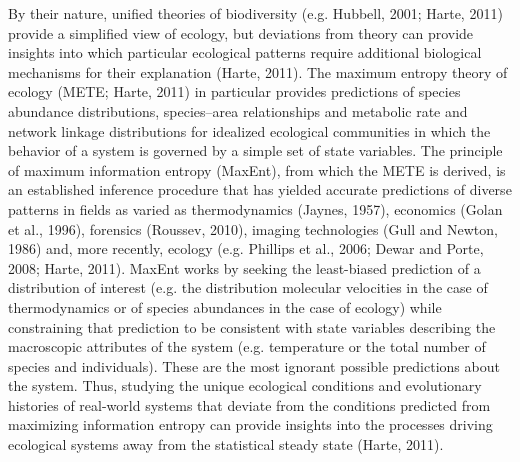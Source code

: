 By their nature, unified theories of biodiversity (e.g. Hubbell, 2001;
Harte, 2011) provide a simplified view of ecology, but deviations from
theory can provide insights into which particular ecological patterns
require additional biological mechanisms for their explanation (Harte,
2011). The maximum entropy theory of ecology (METE; Harte, 2011) in
particular provides predictions of species abundance distributions,
species–area relationships and metabolic rate and network linkage
distributions for idealized ecological communities in which the
behavior of a system is governed by a simple set of state
variables. The principle of maximum information entropy (MaxEnt), from
which the METE is derived, is an established inference procedure that
has yielded accurate predictions of diverse patterns in fields as
varied as thermodynamics (Jaynes, 1957), economics (Golan et al.,
1996), forensics (Roussev, 2010), imaging technologies (Gull and
Newton, 1986) and, more recently, ecology (e.g. Phillips et al., 2006;
Dewar and Porte, 2008; Harte, 2011). MaxEnt works by seeking the
least-biased prediction of a distribution of interest (e.g. the
distribution molecular velocities in the case of thermodynamics or of
species abundances in the case of ecology) while constraining that
prediction to be consistent with state variables describing the
macroscopic attributes of the system (e.g. temperature or the total
number of species and individuals). These are the most ignorant
possible predictions about the system. Thus, studying the unique
ecological conditions and evolutionary histories of real-world systems
that deviate from the conditions predicted from maximizing information
entropy can provide insights into the processes driving ecological
systems away from the statistical steady state (Harte, 2011).

